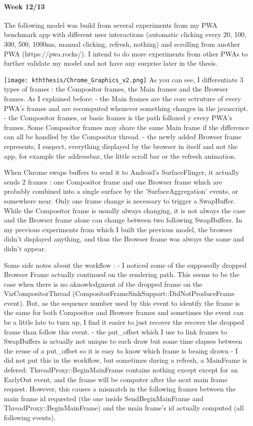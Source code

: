 \documentclass{kththesis}
\begin{document}
\paragraph{Week 12/13}
The following model was build from several experiments from my PWA benchmark app with different user interactions (automatic clicking every 20, 100, 300, 500, 1000ms, manual clicking, refresh, nothing) and scrolling from another PWA (https://pwa.rocks/). I intend to do more experiments from other PWAs to further validate my model and not have any surprise later in the thesis.


\texttt{[image: kththesis/Chrome\_Graphics\_v2.png]}
\newline
As you can see, I differentiate 3 types of frames : the Compositor frames, the Main frames and the Browser frames.
As I explained before:
    - the Main frames are the core sctruture of every PWA's frames and are recomputed whenever something changes in the javascript.
    - the Compositor frames, or basic frames is the path folloxed y every PWA's frames. Some Compositor frames may share the same Main frame if the difference can all be handled by the Compositor thread.
    - the newly added Browser frame represents, I suspect, everything displayed by the browser in itself and not the app, for example the addressbar, the little scroll bar or the refresh animation.

When Chrome swaps buffers to send it to Android's SurfaceFlinger, it actually sends 2 frames : one Compositor frame and one Browser frame which are probably combined into a single surface by the 'SurfaceAggregation' events, or somewhere near. Only one frame change is necessary to trigger a SwapBuffer. While the Compositor frame is usually always changing, it is not always the case and the Browser frame alone can change between two following SwapBuffers. In my previous experiments from which I built the previous model, the browser didn't displayed anything, and thus the Browser frame was always the same and didn't appear.

Some side notes about the workflow :
    - I noticed some of the supposedly dropped Browser Frame actually continued on the rendering path. This seems to be the case when there is no aknowledgment of the dropped frame on the VizCompositorThread (CompositorFrameSinkSupport::DidNotProduceFrame event). But, as the sequence number used by this event to identify the frame is the same for both Compositor and Browser frames and sometimes the event can be a little late to turn up, I find it easier to just recover the recover the dropped frame than follow this event. 
    - the put\_offset which I use to link frames to SwapBuffers is actually not unique to each draw but some time elapses between the reuse of a put\_offset so it is easy to know which frame is beaing drawn
    -  I did not put this in the workflow, but sometimes during a refresh, a MainFrame is defered: ThreadProxy::BeginMainFrame contains nothing except except for an EarlyOut event, and the frame will be computer after the next main frame request. However, this causes a mismatch in the following frames between the main frame id requested (the one inside SendBeginMainFrame and ThreadProxy::BeginMainFrame) and the main frame's id actually computed (all following events).
\end{document}

